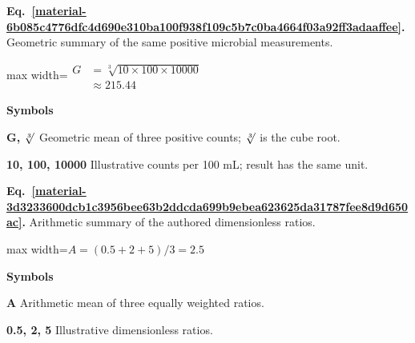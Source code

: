 \documentclass[11pt,a4paper]{article}
\begin{document}
\par\medskip
\noindent\begin{minipage}{\linewidth}
\label{material-6b085c4776dfc4d690e310ba100f938f109c5b7c0ba4664f03a92ff3adaaffee}
\noindent\textbf{Eq.~\ref*{material-6b085c4776dfc4d690e310ba100f938f109c5b7c0ba4664f03a92ff3adaaffee}.} Geometric summary of the same positive microbial measurements.\par\nopagebreak
\begin{center}\begin{adjustbox}{max width=\linewidth}$\displaystyle \begin{aligned}G&=\sqrt[3]{10\times100\times10000}\\&\approx215.44\end{aligned}$\end{adjustbox}\end{center}

\par\noindent\textbf{Symbols}

\par\noindent\textbf{G, \ensuremath{\sqrt[3]{\vphantom{x}}}} Geometric mean of three positive counts; \ensuremath{\sqrt[3]{\vphantom{x}}} is the cube root.

\par\noindent\textbf{10, 100, 10000} Illustrative counts per 100 mL; result has the same unit.

\end{minipage}\par
\medskip

\par\medskip
\noindent\begin{minipage}{\linewidth}
\label{material-3d3233600dcb1c3956bee63b2ddcda699b9ebea623625da31787fee8d9d650ac}
\noindent\textbf{Eq.~\ref*{material-3d3233600dcb1c3956bee63b2ddcda699b9ebea623625da31787fee8d9d650ac}.} Arithmetic summary of the authored dimensionless ratios.\par\nopagebreak
\begin{center}\begin{adjustbox}{max width=\linewidth}$\displaystyle A=(0.5+2+5)/3=2.5$\end{adjustbox}\end{center}

\par\noindent\textbf{Symbols}

\par\noindent\textbf{A} Arithmetic mean of three equally weighted ratios.

\par\noindent\textbf{0.5, 2, 5} Illustrative dimensionless ratios.

\end{minipage}\par
\medskip
\end{document}
